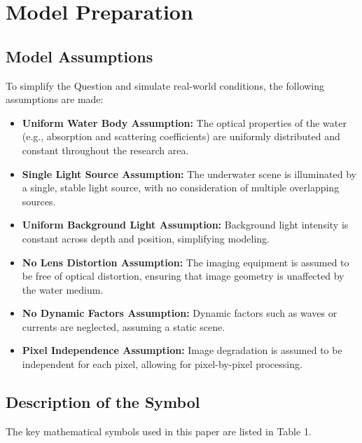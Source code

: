 \documentclass[withoutpreface,bwprint]{cumcmthesis}
\begin{document}
\section{Model Preparation}

\subsection{Model Assumptions}

To simplify the Question and simulate real-world conditions, the following assumptions are made:

\begin{itemize}[itemindent=2em]

\item \textbf{Uniform Water Body Assumption:} The optical properties of the water (e.g., absorption and scattering coefficients) are uniformly distributed and constant throughout the research area.

\item \textbf{Single Light Source Assumption:} The underwater scene is illuminated by a single, stable light source, with no consideration of multiple overlapping sources.

\item \textbf{Uniform Background Light Assumption:} Background light intensity is constant across depth and position, simplifying modeling.

\item \textbf{No Lens Distortion Assumption:} The imaging equipment is assumed to be free of optical distortion, ensuring that image geometry is unaffected by the water medium.

\item \textbf{No Dynamic Factors Assumption:} Dynamic factors such as waves or currents are neglected, assuming a static scene.

\item \textbf{Pixel Independence Assumption:} Image degradation is assumed to be independent for each pixel, allowing for pixel-by-pixel processing.

\end{itemize}

\subsection{Description of the Symbol}

The key mathematical symbols used in this paper are listed in Table 1.
\end{document}
